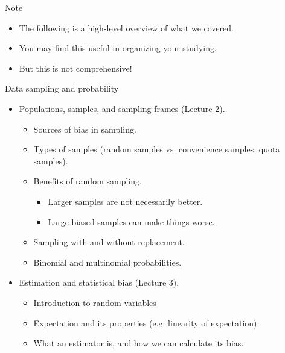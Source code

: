 \documentclass[aspectratio=169]{../latex_main/tntbeamer}  %
\begin{document}
	
	 \begin{frame}{Note}
	     \begin{itemize}
	         \item The following is a high-level overview of what we covered.
	         \item You may find this useful in organizing your studying.
	         \item But this is not comprehensive!
	     \end{itemize}
	 \end{frame}
	 
	 
	 
	 \begin{frame}{Data sampling and probability}
	     \begin{itemize}
	         \item Populations, samples, and sampling frames (Lecture 2).
	         \begin{itemize}
	             \item Sources of bias in sampling.
	             \item Types of samples (random samples vs. convenience samples, quota samples).
	             \item Benefits of random sampling.
	             \begin{itemize}
	                 \item Larger samples are not necessarily better.
	                 \item Large biased samples can make things worse.
	             \end{itemize}
	             \item Sampling with and without replacement.
	             \item Binomial and multinomial probabilities.
	         \end{itemize}
	         \item Estimation and statistical bias (Lecture 3).
	         \begin{itemize}
	             \item Introduction to random variables
	             \item Expectation and its properties (e.g. linearity of expectation).
	             \item What an estimator is, and how we can calculate its bias.
	         \end{itemize}
	     \end{itemize}
	 \end{frame}
	 
\end{document}
